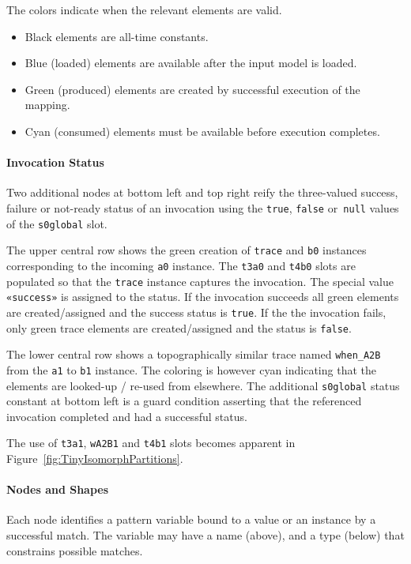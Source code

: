 \documentclass{jot}
\begin{document}
The colors indicate when the relevant elements are valid.
\begin{itemize}
	\item Black elements are all-time constants.
	\item Blue (loaded) elements are available after the input model is loaded.
	\item Green (produced) elements are created by successful execution of the mapping.
	\item Cyan (consumed) elements must be available before execution completes.
\end{itemize}

\paragraph{Invocation Status}

Two additional nodes at bottom left and top right reify the three-valued success, failure or not-ready status of an invocation using the \verb|true|, \verb|false| or\verb| null| values of the \verb|s0global| slot.

The upper central row shows the green creation of \verb|trace| and \verb|b0| instances corresponding to the incoming \verb|a0| instance. The \verb|t3a0| and \verb|t4b0| slots are populated so that the \verb|trace| instance captures the invocation. The special value \verb|«success»| is assigned to the status. If the invocation succeeds all green elements are created/assigned and the success status is \verb|true|. If the the invocation fails, only green trace elements are created/assigned and the status is \verb|false|.

The lower central row shows a topographically similar trace named \verb|when_A2B| from the \verb|a1| to \verb|b1| instance. The coloring is however cyan indicating that the elements are looked-up / re-used from elsewhere. The additional \verb|s0global| status constant at bottom left is a guard condition asserting that the referenced invocation completed and had a successful status.

The use of \verb|t3a1|, \verb|wA2B1| and \verb|t4b1| slots becomes apparent in Figure~\ref{fig:TinyIsomorphPartitions}.

\paragraph{Nodes and Shapes}

Each node identifies a pattern variable bound to a value or an instance by a successful match. The variable may have a name (above), and a type (below) that constrains possible matches.
\end{document}
